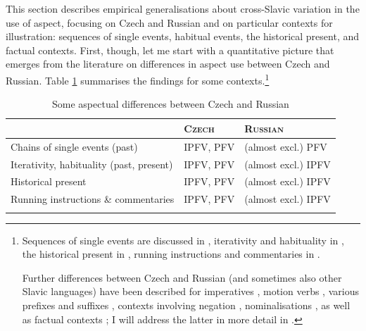\documentclass[output=paper,colorlinks,citecolor=brown]{langscibook}
\begin{document}
This section describes empirical generalisations about cross-Slavic variation in the use of aspect, focusing on Czech and Russian and on particular contexts for illustration: sequences of single events, habitual events, the historical present, and factual contexts. %
%
%
First, though, let me start with a quantitative picture that emerges from the literature on differences in aspect use between Czech and Russian. Table \ref{unterschiede} summarises the findings for some contexts.\footnote{Sequences of single events are discussed in \citet{ivancev59/60,eckert84,monnesland1984,%
stunova93,Dickey2000,petruxina00,gehrke02,gehrke22,barentsen08,fortuin2015typology}, iterativity and habituality in \citet{%
eckert84,%
stunova93,Dickey2000,kresin00,gehrke02,gehrke22,duebbersdiss,fortuin2015typology}, the historical present in \citet{krizkova55,bondarko58,bondarko59,petruxina83,stunova93,%
Dickey2000,fortuin2015typology}, running instructions and commentaries in \citet{Dickey2000}. 

Further differences between Czech and Russian (and sometimes also other Slavic languages) have been described for imperatives \citep[][]{dokulil48,eckert84,benacchio10,waldenfels12,waldenfels14,alvestad13%
}, motion verbs \citep[][]{eckert91,gehrke02,gehrke22}, various prefixes and suffixes \citep[][]{nuebler92,petruxina00,dickey01,dickey05,dickey11,dickeyhutch}, contexts involving negation \citep[][]{dickeykresin09,waldenfels14,duebbersdiss}, nominalisations \citep[][]{Dickey2000,biskup23adv,gehrkeadv23}, as well as factual contexts \citep[][]{Dickey2000,gehrke02,gehrke22,alvestad13,duebbersdiss,fortuin2015typology,Mueller-Reichau2018a,klimek22}; I will address the latter in more detail in .}

\begin{table}
	\caption{Some aspectual differences between Czech and Russian}
	\label{unterschiede}
		\begin{tabular}{lll}
	  \lsptoprule
			&\textsc{Czech} 	&\textsc{Russian}  \\ \midrule[0.25ex] 
				Chains of single events (past)	&IPFV, PFV &(almost excl.) PFV\\[0.25ex]
				Iterativity, habituality (past, present)	&IPFV, PFV&(almost excl.) IPFV 	
				\\[0.25ex]
				Historical present	&IPFV, PFV&(almost excl.) IPFV	 \\[0.25ex]
 			Running instructions \& commentaries	&IPFV, PFV&(almost excl.) IPFV	 \\
      \lspbottomrule
	\end{tabular}
\end{table}
\end{document}
